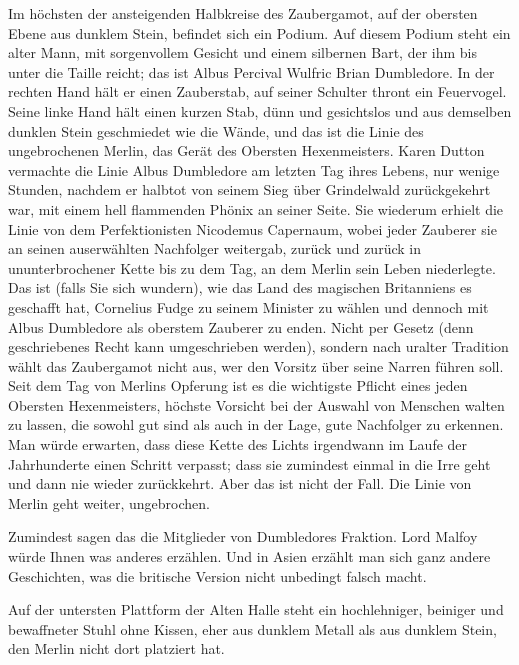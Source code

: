 Im höchsten der ansteigenden Halbkreise des Zaubergamot, auf der obersten Ebene aus dunklem Stein, befindet sich ein Podium. Auf diesem Podium steht ein alter Mann, mit sorgenvollem Gesicht und einem silbernen Bart, der ihm bis unter die Taille reicht; das ist Albus Percival Wulfric Brian Dumbledore. In der rechten Hand hält er einen Zauberstab, auf seiner Schulter thront ein Feuervogel. Seine linke Hand hält einen kurzen Stab, dünn und gesichtslos und aus demselben dunklen Stein geschmiedet wie die Wände, und das ist die Linie des ungebrochenen Merlin, das Gerät des Obersten Hexenmeisters. Karen Dutton vermachte die Linie Albus Dumbledore am letzten Tag ihres Lebens, nur wenige Stunden, nachdem er halbtot von seinem Sieg über Grindelwald zurückgekehrt war, mit einem hell flammenden Phönix an seiner Seite. Sie wiederum erhielt die Linie von dem Perfektionisten Nicodemus Capernaum, wobei jeder Zauberer sie an seinen auserwählten Nachfolger weitergab, zurück und zurück in ununterbrochener Kette bis zu dem Tag, an dem Merlin sein Leben niederlegte. Das ist (falls Sie sich wundern), wie das Land des magischen Britanniens es geschafft hat, Cornelius Fudge zu seinem Minister zu wählen und dennoch mit Albus Dumbledore als oberstem Zauberer zu enden. Nicht per Gesetz (denn geschriebenes Recht kann umgeschrieben werden), sondern nach uralter Tradition wählt das Zaubergamot nicht aus, wer den Vorsitz über seine Narren führen soll. Seit dem Tag von Merlins Opferung ist es die wichtigste Pflicht eines jeden Obersten Hexenmeisters, höchste Vorsicht bei der Auswahl von Menschen walten zu lassen, die sowohl gut sind als auch in der Lage, gute Nachfolger zu erkennen. Man würde erwarten, dass diese Kette des Lichts irgendwann im Laufe der Jahrhunderte einen Schritt verpasst; dass sie zumindest einmal in die Irre geht und dann nie wieder zurückkehrt. Aber das ist nicht der Fall. Die Linie von Merlin geht weiter, ungebrochen.

Zumindest sagen das die Mitglieder von Dumbledores Fraktion. Lord Malfoy würde Ihnen was anderes erzählen. Und in Asien erzählt man sich ganz andere Geschichten, was die britische Version nicht unbedingt falsch macht.

Auf der untersten Plattform der Alten Halle steht ein hochlehniger, beiniger und bewaffneter Stuhl ohne Kissen, eher aus dunklem Metall als aus dunklem Stein, den Merlin nicht dort platziert hat.

